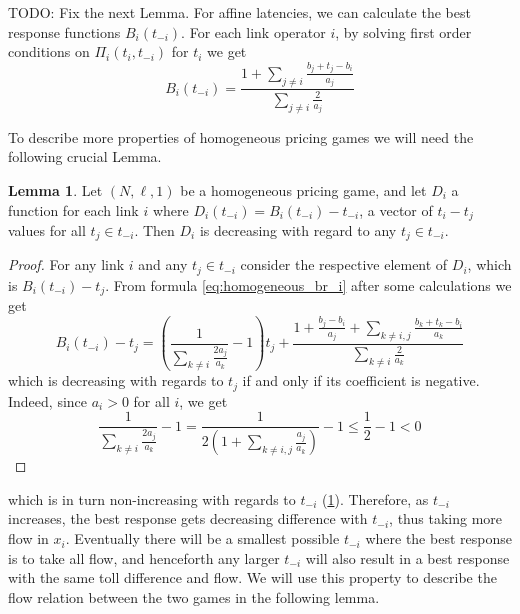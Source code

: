 \documentclass[10pt,a4paper]{book}
\theoremstyle{definition}
\newtheorem{lemma}[definition]{Lemma}
\theoremstyle{comment}
\begin{document}
TODO: Fix the next Lemma.
For affine latencies, we can calculate the best response functions $B_i(t_{-i})$.
For each link operator $i$, by solving first order conditions on $\Pi_i(t_i, t_{-i})$ for $t_i$ we get
\begin{equation}
	\label{eq:homogeneous_br_i}
	B_i(t_{-i}) = \frac{1 + \sum_{j \ne i}\frac{b_j + t_j - b_i}{a_j}}{\sum_{j \ne i}\frac{2}{a_j}}
\end{equation}


To describe more properties of homogeneous pricing games we will need the following crucial Lemma.
\begin{lemma}
	\label{lemma:tolls_diff}
	Let $(N, \ell, 1)$ be a homogeneous pricing game, and let $D_i$ a function for each link $i$ where $D_i(t_{-i}) = B_i(t_{-i}) - t_{-i}$, a vector of $t_i - t_j$ values for all $t_j \in t_{-i}$.
	Then $D_i$ is decreasing with regard to any $t_j \in t_{-i}$.
\end{lemma}

\begin{proof}
	For any link $i$ and any $t_j \in t_{-i}$ consider the respective element of $D_i$, which is $B_i(t_{-i}) - t_j$.
	From formula \ref{eq:homogeneous_br_i} after some calculations we get
	\[
	B_i(t_{-i}) - t_j = \left(\frac{1}{\sum_{k \ne i} \frac{2a_j}{a_k}} - 1\right)t_j + \frac{1 + \frac{b_j - b_i}{a_j} + \sum_{k \ne i, j}\frac{b_k + t_k - b_i}{a_k}}{\sum_{k \ne i} \frac{2}{a_k}}
	\]
	which is decreasing with regards to $t_j$ if and only if its coefficient is negative.
	Indeed, since $a_i > 0$ for all $i$, we get
	\[
	\frac{1}{\sum_{k \ne i} \frac{2a_j}{a_k}} - 1 = \frac{1}{2 \left(1 + \sum_{k \ne i, j} \frac{a_j}{a_k}\right)} - 1 \leq \frac{1}{2} - 1 < 0
	\]
\end{proof}

 which is in turn non-increasing with regards to $t_{-i}$ (\ref{lemma:tolls_diff}).
Therefore, as $t_{-i}$ increases, the best response gets decreasing difference with $t_{-i}$, thus taking more flow in $x_i$.
Eventually there will be a smallest possible $t_{-i}$ where the best response is to take all flow, and henceforth any larger $t_{-i}$ will also result in a best response with the same toll difference and flow.
We will use this property to describe the flow relation between the two games in the following lemma.
\end{document}
